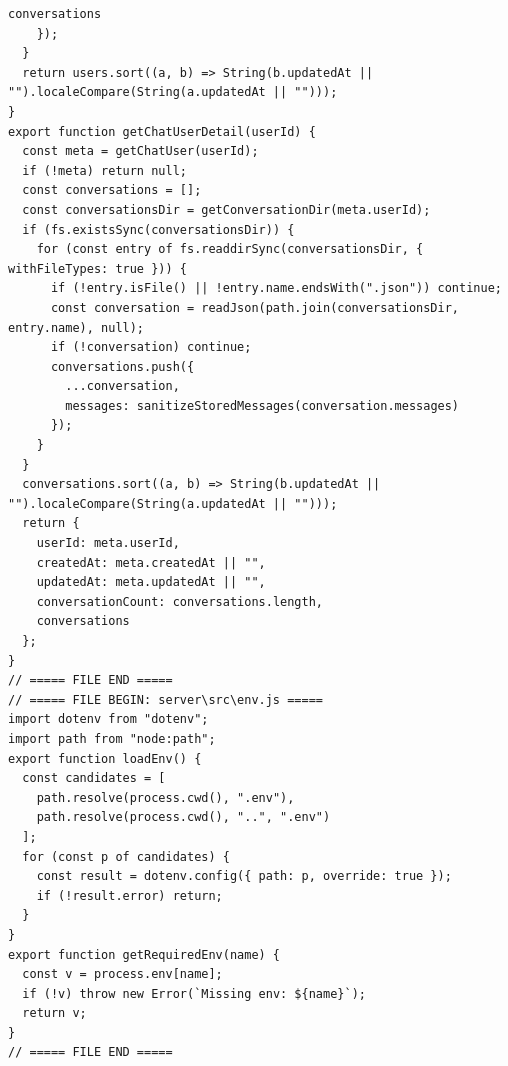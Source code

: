 \documentclass[12pt,a4paper]{article}
\begin{document}
\begin{Verbatim}[fontsize=\footnotesize]
      conversations
    });
  }
  return users.sort((a, b) => String(b.updatedAt || "").localeCompare(String(a.updatedAt || "")));
}
export function getChatUserDetail(userId) {
  const meta = getChatUser(userId);
  if (!meta) return null;
  const conversations = [];
  const conversationsDir = getConversationDir(meta.userId);
  if (fs.existsSync(conversationsDir)) {
    for (const entry of fs.readdirSync(conversationsDir, { withFileTypes: true })) {
      if (!entry.isFile() || !entry.name.endsWith(".json")) continue;
      const conversation = readJson(path.join(conversationsDir, entry.name), null);
      if (!conversation) continue;
      conversations.push({
        ...conversation,
        messages: sanitizeStoredMessages(conversation.messages)
      });
    }
  }
  conversations.sort((a, b) => String(b.updatedAt || "").localeCompare(String(a.updatedAt || "")));
  return {
    userId: meta.userId,
    createdAt: meta.createdAt || "",
    updatedAt: meta.updatedAt || "",
    conversationCount: conversations.length,
    conversations
  };
}
// ===== FILE END =====
// ===== FILE BEGIN: server\src\env.js =====
import dotenv from "dotenv";
import path from "node:path";
export function loadEnv() {
  const candidates = [
    path.resolve(process.cwd(), ".env"),
    path.resolve(process.cwd(), "..", ".env")
  ];
  for (const p of candidates) {
    const result = dotenv.config({ path: p, override: true });
    if (!result.error) return;
  }
}
export function getRequiredEnv(name) {
  const v = process.env[name];
  if (!v) throw new Error(`Missing env: ${name}`);
  return v;
}
// ===== FILE END =====
\end{Verbatim}
\newpage
{}
\fancyhead[R]{}
\end{document}
